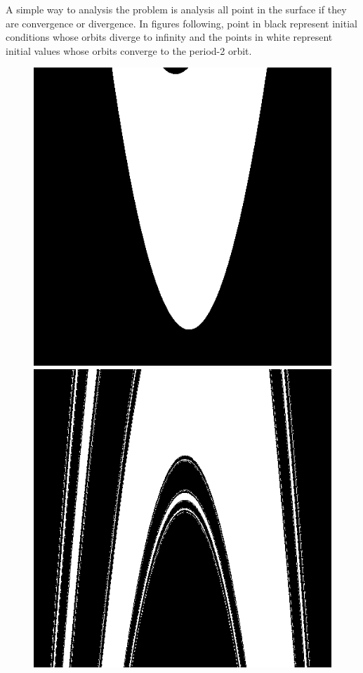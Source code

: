 \documentclass[12pt]{article}
\theoremstyle{plain}
\begin{document}
A simple way to analysis the problem is analysis all point in the surface if they are convergence or divergence. In figures following, point in black represent initial conditions whose orbits diverge to infinity and the points in white represent initial values whose orbits converge to the period-2 orbit.\\[4ex]
\begin{figure}[H]
\begin{minipage}[c][0.24\width]{0.24\textwidth}
   \centering
   \includegraphics[width=\textwidth]{figure/section2/Henon-orbit-0-0*4.png}
\end{minipage}
\begin{minipage}[c][0.24\width]{0.24\textwidth}
   \centering
   \includegraphics[width=\textwidth]{figure/section2/Henon-orbit-2--0*3.png}

\end{minipage}
\end{figure}
\end{document}

